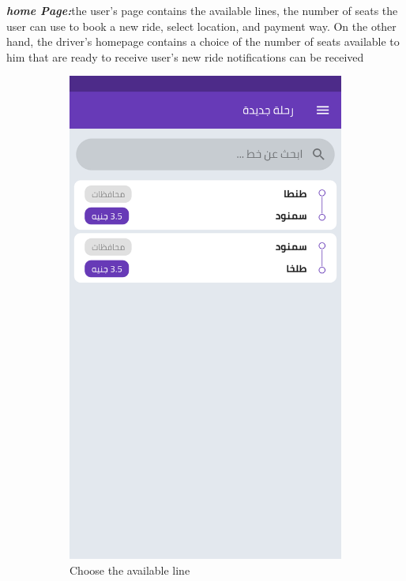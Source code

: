 \textbf{\textit{home Page:}}the user's page  contains the available lines, the number of seats the user can use to book a new ride, select location, and payment way.
 On the other hand, the driver's homepage contains a choice of the number of seats available to him that are ready to receive user's new ride notifications can be received
\begin{figure}[H] 
  \begin{subfigure}[b]{0.5\linewidth}
    \centering
    \includegraphics[width=0.75\linewidth]{images/ch3/0.png}
    \caption{Choose the available line} 
    \label{fig7:a} 
    \vspace{4ex}
  \end{subfigure}%
  \begin{subfigure}[b]{0.5\linewidth}
    \centering

\end{subfigure}
\end{figure}
